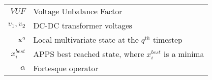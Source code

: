 \begin{scriptsize}
\begin{tabularx}{\textwidth}{r|X}
$VUF$  														& Voltage Unbalance Factor\\
$v_1,v_2$                         & DC-DC transformer voltages\\
$\textbf{x}^{q}$                           & Local multivariate state at the $q^{th}$ timestep\\
$x_i^{best}$											& APPS best reached state, where $x_i^{best}$ is a minima\\
$\alpha$													& Fortesque operator\\

\end{tabularx}
\end{scriptsize}
